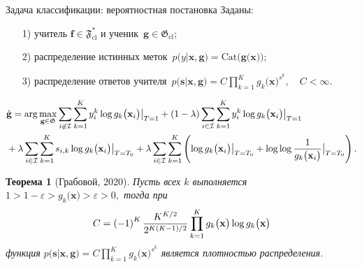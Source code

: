\documentclass[10pt,pdf,hyperref={unicode}]{beamer}
\newtheorem{rustheorem}{Теорема}
\begin{document}
\begin{frame}{Задача классификации: вероятностная постановка}
\justifying
Заданы:
\begin{enumerate}
	\item[1)] учитель $\mathbf{f}\in\mathfrak{F}_{\text{cl}}^{*}$ и ученик~$\mathbf{g}\in\mathfrak{G}_{\text{cl}}$;
	\item[2)] распределение истинных меток~$p\bigr(y|\mathbf{x}, \mathbf{g}\bigr) = \text{Cat}\bigr(\mathbf{g}\bigr(\mathbf{x}\bigr)\bigr)$;
	\item[3)] распределение ответов учителя~$p\bigr(\mathbf{s}|\mathbf{x}, \mathbf{g}\bigr) = C\prod_{k=1}^{K}g_k\bigr(\mathbf{x}\bigr)^{s^k}, \quad C < \infty.$
\end{enumerate}
\[
\setlength\abovedisplayskip{0pt}
\begin{aligned}
&\hat{\mathbf{g}} = \arg\max_{\mathbf{g}\in \mathfrak{G}} \sum_{i\not\in \mathcal{I}}\sum_{k=1}^{K}y_i^k\log g_k\bigr(\mathbf{x}_i\bigr)\bigr|_{T=1} 
+ \left(1-\lambda\right)\sum_{i\in \mathcal{I}}\sum_{k=1}^{K}y_i^k\log g_k\bigr(\mathbf{x}_i\bigr)\bigr|_{T=1} \\
&+ \lambda\sum_{i\in \mathcal{I}}\sum_{k=1}^{K}s_{i,k}\log g_k\bigr(\mathbf{x}_i\bigr)\bigr|_{T=T_0} 
+ \lambda \sum_{i\in \mathcal{I}}\sum_{k=1}^{K}\left(\log g_k\bigr(\mathbf{x}_i\bigr)\bigr|_{T=T_0} + \log\log\frac{1}{g_k\bigr(\mathbf{x}_i\bigr)}\bigr|_{T=T_0}\right).
\end{aligned}
\setlength\belowdisplayskip{0pt}
\]

\begin{rustheorem}[Грабовой, 2020]
\label{theorem:st:dist}
Пусть всех $k$ выполняется $1 > 1- \varepsilon > g_k\bigr(\mathbf{x}\bigr) > \varepsilon > 0,$ тогда при
\[
\setlength\abovedisplayskip{0pt}
C=\left(-1\right)^{K}\frac{K^{K/2}}{2^{K(K-1)/2}}\prod_{k=1}^{K}g_k\bigr(\mathbf{x}\bigr)\log g_k\bigr(\mathbf{x}\bigr)
\setlength\belowdisplayskip{0pt}
\]
функция $p\bigr(\mathbf{s}|\mathbf{x}, \mathbf{g}\bigr) = C\prod_{k=1}^{K}g_k\bigr(\mathbf{x}\bigr)^{s^k}$ является плотностью распределения.
\end{rustheorem}

\end{frame}
\end{document}
